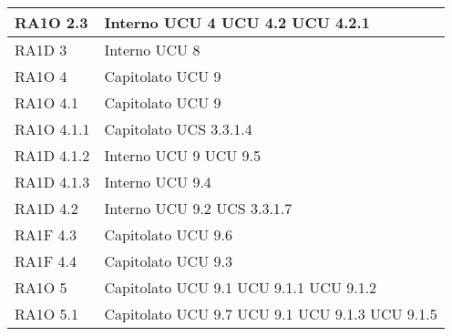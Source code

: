 \begin{center}
\begin{longtable}{ | p{5cm} | p{5cm} |}
        RA1O 2.3 &  Interno \newline  UCU 4 \newline  UCU 4.2 \newline  UCU 4.2.1 \newline  \\ \hline      
        RA1D 3 &  Interno \newline  UCU 8 \newline  \\ \hline      
        RA1O 4 &  Capitolato \newline  UCU 9 \newline  \\ \hline      
        RA1O 4.1 &  Capitolato \newline  UCU 9 \newline  \\ \hline      
        RA1O 4.1.1 &  Capitolato \newline  UCS 3.3.1.4 \newline  \\ \hline      
        RA1D 4.1.2 &  Interno \newline  UCU 9 \newline  UCU 9.5 \newline  \\ \hline      
        RA1D 4.1.3 &  Interno \newline  UCU 9.4 \newline  \\ \hline      
        RA1D 4.2 &  Interno \newline  UCU 9.2 \newline  UCS 3.3.1.7 \newline  \\ \hline      
        RA1F 4.3 &  Capitolato \newline  UCU 9.6 \newline  \\ \hline      
        RA1F 4.4 &  Capitolato \newline  UCU 9.3 \newline  \\ \hline      
        RA1O 5 &  Capitolato \newline  UCU 9.1 \newline  UCU 9.1.1 \newline  UCU 9.1.2 \newline  \\ \hline      
        RA1O 5.1 &  Capitolato \newline  UCU 9.7 \newline  UCU 9.1 \newline  UCU 9.1.3 \newline  UCU 9.1.5 \newline  \\ \hline      

\end{longtable}
\end{center}
